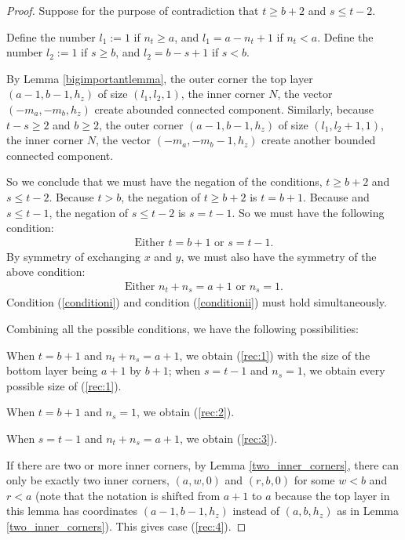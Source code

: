 \documentclass{amsart}[10pt]
\theoremstyle{plain}
\theoremstyle{definition}
\begin{document}
\begin{proof}
Suppose for the purpose of contradiction that $t \geq b+2$ and $s \leq  t-2$. 

Define the number $l_1:=1$ if $n_t \geq a$, and $l_1=a-n_t+1$ if $n_t <a$. Define the number $l_2:=1$ if $s \geq b$, and $l_2=b-s+1$ if $s <b$. 

By Lemma \ref{bigimportantlemma}, the outer corner the top layer $(a-1,b-1, h_z)$ of size $(l_1, l_2,1)$, the inner corner $N$, the vector $(-m_a, -m_b,h_z)$ create abounded connected component. Similarly, because $t-s \geq 2$ and $b \geq 2$, the outer corner $(a-1,b-1, h_z)$ of size $(l_1, l_2+1,1)$, the inner corner $N$, the vector $(-m_a,-m_b-1,h_z)$ create another bounded connected component. 

So we conclude that we must have the negation of the conditions, $t \geq b+2$ and $s \leq  t-2$. Because $t>b$, the negation of $t \geq b+2$ is $t=b+1$. Because and $s \leq t-1$, the negation of $s \leq  t-2$ is $s=t-1$. So we must have the following condition:
\begin{align}
\label{conditioni}
\text{Either } t=b+1 \text{ or } s=t-1. 
\tag{i}
\end{align}%
By symmetry of exchanging $x$ and $y$, we must also have the symmetry of the above condition:
\begin{align}
\label{conditionii}
\text{Either } n_t+n_s=a+1 \text{ or } n_s=1.
\tag{ii} 
\end{align}%
Condition (\ref{conditioni}) and condition (\ref{conditionii}) must hold simultaneously. 

Combining all the possible conditions, we have the following possibilities:

When $t=b+1$ and $n_t+n_s=a+1$, we obtain (\ref{rec:1}) with the size of the bottom layer being $a+1$ by $b+1$; when $s=t-1$ and $n_s=1$, we obtain every possible size of (\ref{rec:1}).

When $t=b+1$ and $n_s=1$, we obtain (\ref{rec:2}).

When $s=t-1$ and $n_t+n_s=a+1$, we obtain (\ref{rec:3}). 

If there are two or more inner corners, by Lemma \ref{two_inner_corners}, there can only be exactly two inner corners, $(a, w, 0)$ and $(r, b,0)$ for some $w<b$ and $r<a$ (note that the notation is shifted from $a+1$ to $a$ because the top layer in this lemma has coordinates $(a-1, b-1, h_z)$ instead of $(a, b, h_z)$ as in Lemma \ref{two_inner_corners}). This gives case (\ref{rec:4}). 


\end{proof}
\end{document}
